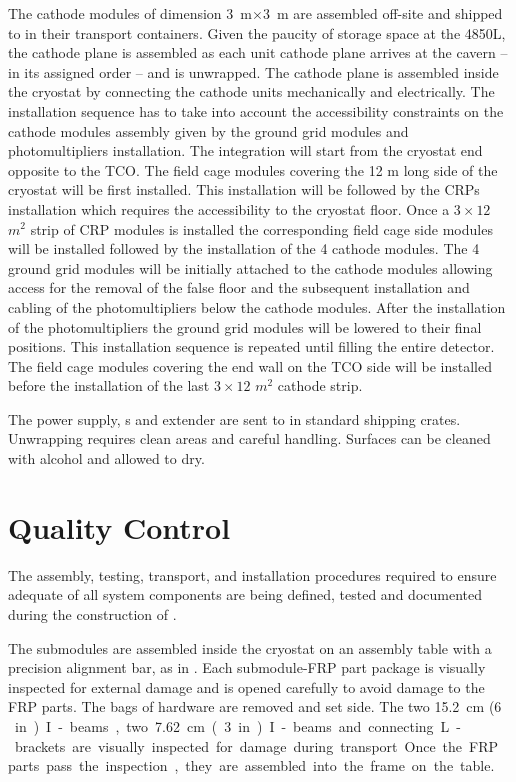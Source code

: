 The cathode modules of dimension  \SI{3}{m}$\times$\SI{3}{m} are assembled off-site and shipped to \surf in their transport containers. Given the paucity of storage space at the 4850L, the cathode plane is assembled as each unit cathode plane arrives at the cavern -- in its assigned order -- and is unwrapped. The cathode plane is assembled inside the cryostat by connecting the cathode units mechanically and electrically. The installation sequence has to take into account the accessibility constraints on the cathode modules assembly given by the ground grid modules and photomultipliers installation. The integration will start from  the cryostat end opposite to the TCO.  The field cage modules covering the 12 m long side of the cryostat will be first installed. This installation will be followed by the CRPs installation which requires the accessibility to the cryostat floor. Once a $3 \times 12$ $m^2$ strip of CRP modules is installed the corresponding field cage side modules will be installed followed by the installation of the 4 cathode modules. The 4 ground grid modules will be initially attached to the cathode modules allowing access for the removal of the false floor  and the subsequent installation and cabling of the photomultipliers below the cathode modules.  After the installation of the photomultipliers the ground grid modules will be lowered to their final positions. This installation sequence is repeated until filling the entire detector. The field cage modules covering the end wall on the TCO side will be installed before the installation of the last  $3 \times 12$ $m^2$ cathode strip.


The power supply, \fdth{}s and  extender are sent to \surf in standard shipping crates. Unwrapping requires clean areas and careful handling. Surfaces can be cleaned with alcohol and allowed to dry.


\section{Quality Control}
\label{sec:fddp-hv-qc}

The assembly, testing, transport, and installation procedures required to ensure adequate  of all  system components are being defined, tested and documented during the construction of .

The  submodules are assembled inside the cryostat on an assembly table with a precision alignment bar, as in .  %
Each submodule-FRP part package is visually inspected for external damage and is opened carefully to avoid damage to the FRP parts.  
The bags of hardware are removed and set side.   The two \SI{15.2}{\cm} (\SI{6}\,in) I-beams, two \SI{7.62}{cm} (\SI{3}{in}) I-beams and connecting L-brackets are visually inspected for  damage during transport.  Once the FRP parts pass the inspection, they are assembled into the frame on the table.  

